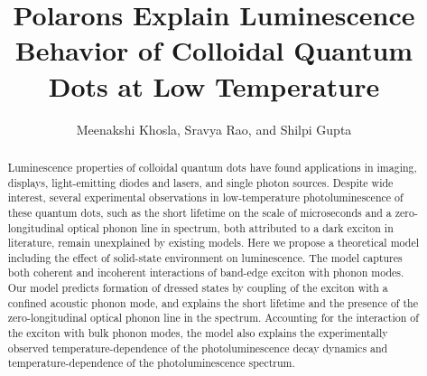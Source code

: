 \documentclass[aps,pra,preprint,groupedaddress]{revtex4-1}
\begin{document}
\title{Polarons Explain Luminescence Behavior of Colloidal Quantum Dots at Low Temperature}
\author{Meenakshi Khosla, Sravya Rao, and Shilpi Gupta}

\begin{abstract}
Luminescence properties of colloidal quantum dots have found applications in imaging, displays, light-emitting diodes and lasers, and single photon sources. Despite wide interest, several experimental observations in low-temperature photoluminescence of these quantum dots, such as the short lifetime on the scale of microseconds and a zero-longitudinal optical phonon line in spectrum, both attributed to a dark exciton in literature, remain unexplained by existing models. Here we propose a theoretical model including the effect of solid-state environment on luminescence. The model captures both coherent and incoherent interactions of band-edge exciton with phonon modes. Our model predicts formation of dressed states by coupling of the exciton with a confined acoustic phonon mode, and explains the short lifetime and the presence of the zero-longitudinal optical phonon line in the spectrum. Accounting for the interaction of the exciton with bulk phonon modes, the model also explains the experimentally observed temperature-dependence of the photoluminescence decay dynamics and temperature-dependence of the photoluminescence spectrum.
\end{abstract}

\maketitle


\end{document}
